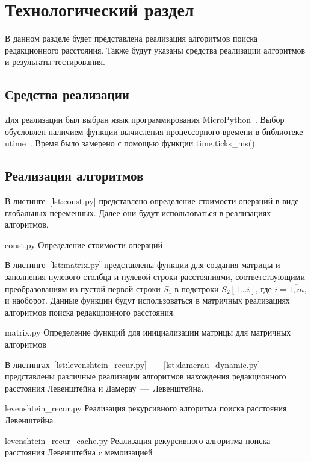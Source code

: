 \chapter{Технологический раздел}

В данном разделе будет представлена реализация алгоритмов поиска редакционного расстояния. Также будут указаны средства реализации алгоритмов и результаты тестирования.

\section{Средства реализации}

Для реализации был выбран язык программирования MicroPython~\cite{python}. Выбор обусловлен наличием функции вычисления процессорного времени в библиотеке utime~\cite{time}. Время было замерено с помощью функции time.ticks\_ms().

\section{Реализация алгоритмов}

В листинге~\ref{lst:const.py} представлено определение стоимости операций в виде глобальных переменных. Далее они будут использоваться в реализациях алгоритмов.

{const.py}
{Определение стоимости операций}

В листинге~\ref{lst:matrix.py} представлены функции для создания матрицы и заполнения нулевого столбца и нулевой строки расстояниями, соответствующими преобразованиям из пустой первой строки \(S_1\) в подстроки \(S_2[1...i]\), где \(i = \overline{1,m}\), и наоборот. Данные функции будут использоваться в матричных реализациях алгоритмов поиска редакционного расстояния.

\clearpage

{matrix.py}
{Определение функций для инициализации матрицы для матричных алгоритмов}

В листингах~\ref{lst:levenshtein_recur.py}~---~\ref{lst:damerau_dynamic.py} представлены различные реализации алгоритмов нахождения редакционного расстояния Левенштейна и Дамерау~---~Левенштейна.

{levenshtein_recur.py}
{Реализация рекурсивного алгоритма поиска расстояния Левенштейна}

\clearpage

{levenshtein_recur_cache.py}
{Реализация рекурсивного алгоритма поиска расстояния Левенштейна c мемоизацией}

